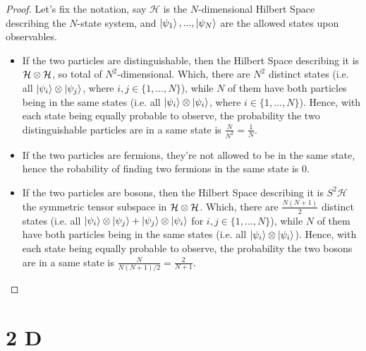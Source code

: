 \documentclass{article}
\begin{document}
\begin{proof}

    Let's fix the notation, say $\mathcal{H}$ is the $N$-dimensional Hilbert Space describing the $N$-state system, and $\ket{\psi_1},...,\ket{\psi_N}$ are the allowed states upon observables.

    \hfil

    \begin{itemize}
        \item[(a)] If the two particles are distinguishable, then the Hilbert Space describing it is $\mathcal{H}\otimes \mathcal{H}$, so total of $N^2$-dimensional. Which, there are $N^2$ distinct states (i.e. all $\ket{\psi_i}\otimes \ket{\psi_j}$, where $i,j\in\{1,...,N\}$), while $N$ of them have both particles being in the same states (i.e. all $\ket{\psi_i}\otimes \ket{\psi_i}$, where $i\in\{1,...,N\}$). Hence, with each state being equally probable to observe, the probability the two distinguishable particles are in a same state is $\frac{N}{N^2} = \frac{1}{N}$.
        
        \hfil

        \item[(b)] If the two particles are fermions, they're not allowed to be in the same state, hence the robability of finding two fermions in the same state is $0$.
        
        \hfil

        \item[(c)] If the two particles are bosons, then the Hilbert Space describing it is $S^2\mathcal{H}$ the symmetric tensor subspace in $\mathcal{H}\otimes\mathcal{H}$. Which, there are $\frac{N(N+1)}{2}$ distinct states (i.e. all $\ket{\psi_i}\otimes \ket{\psi_j}+\ket{\psi_j}\otimes \ket{\psi_i}$ for $i,j\in\{1,...,N\}$), while $N$ of them have both particles being in the same states (i.e. all $\ket{\psi_i}\otimes \ket{\psi_i}$). Hence, with each state being equally probable to observe, the probability the two bosons are in a same state is $\frac{N}{N(N+1)/2} = \frac{2}{N+1}$.
    \end{itemize}
\end{proof}

\newpage

\section*{2 D}
\end{document}
